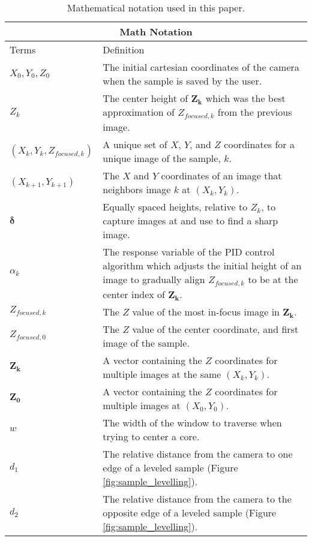 \begin{table}[h]
    \centering
    \caption{Mathematical notation used in this paper.} %
    \label{tab:math_notation}
    \begin{tabular}{ |p{3.5cm}||p{11.5cm}|  }
      \hline
      \multicolumn{2}{|c|}{Math Notation} \\ %
      \hline
      Terms & Definition\\ 
      \hline
      $X_0, Y_0, Z_0$   &The initial cartesian coordinates of the camera when the sample is saved by the user. \\
      $Z_k$ & The center height of $\boldsymbol{Z_k}$ which was the best approximation of $Z_{focused,k}$ from the previous image.\\ 
      $(X_k, Y_k, Z_{focused,k})$ & A unique set of $X$, $Y$, and $Z$ coordinates for a unique image of the sample, $k$. \\
      $(X_{k+1}, Y_{k+1})$ & The $X$ and $Y$ coordinates of an image that neighbors image $k$ at $(X_k, Y_k)$. \\
      $\boldsymbol{\delta}$ & Equally spaced heights, relative to $Z_k$, to capture images at and use to find a sharp image. \\
      $\alpha_k$ & The response variable of the PID control algorithm which adjusts the initial height of an image to gradually align $Z_{focused,k}$ to be at the center index of $\boldsymbol{Z_k}$.\\
      $Z_{focused,k}$ & The $Z$ value of the most in-focus image in $\boldsymbol{Z_k}$. \\
      $Z_{focused,0}$ & The $Z$ value of the center coordinate, and first image of the sample. \\
      $\boldsymbol{Z_k}$ & A vector containing the $Z$ coordinates for multiple images at the same $(X_k, Y_k)$. \\
      $\boldsymbol{Z_0}$ & A vector containing the $Z$ coordinates for multiple images at $(X_0, Y_0)$. \\
      $w$ & The width of the window to traverse when trying to center a core. \\
      $d_1$ & The relative distance from the camera to one edge of a leveled sample (Figure \ref{fig:sample_levelling}).\\
      $d_2$ & The relative distance from the camera to the opposite edge of a leveled sample (Figure \ref{fig:sample_levelling}). \\
      \hline
    \end{tabular}
    \end{table}